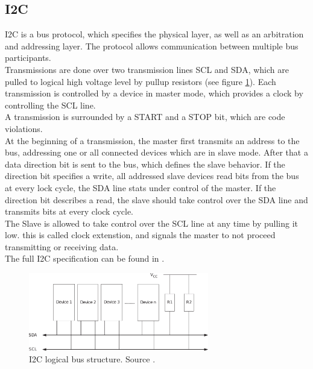 \documentclass[a4paper]{scrreprt}
\begin{document}
\subsection{I2C}
I2C is a bus protocol, which specifies the physical layer, as well as an arbitration and addressing layer. The protocol allows communication between multiple bus participants.\\
Transmissions are done over two transmission lines SCL and SDA, which
are pulled to logical high voltage level by pullup resistors (see
figure \ref{fig:i2c}). Each transmission is controlled by a device
in master mode, which provides a clock by controlling the SCL line.\\
A transmission is surrounded by a START and a STOP bit, which are code violations.\\
At the beginning of a transmission, the master first transmits an
address to the bus, addressing one or all connected devices which
are in slave mode. After that a data direction bit is sent to the
bus, which defines the slave behavior. If the direction bit specifies a write, all addressed slave devices read bits from the bus at every 
lock cycle, the SDA line stats under control of the master. If the
direction bit describes a read, the slave should take control over
the SDA line and transmits bits at every clock cycle.\\
The Slave is allowed to take control over the SCL line at any time
by pulling it low. this is called clock extenstion, and signals the
master to not proceed transmitting or receiving data.\\
The full I2C specification can be found in \cite{i2c}.
\begin{figure}
	\centering
	\includegraphics[width=0.7\textwidth]{img/i2c.pdf}
  \caption{I2C logical bus structure. Source \cite{i2c}.}
	\label{fig:i2c}
\end{figure}
\end{document}
